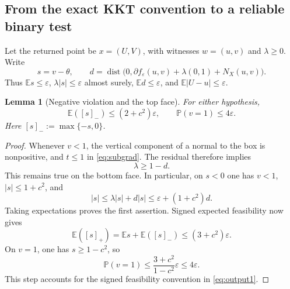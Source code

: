 \documentclass[11pt,a4paper]{article}
\newcommand{\E}{\mathbb E}
\newcommand{\Pp}{\mathbb P}
\newcommand{\eps}{\varepsilon}
\DeclareMathOperator{\dist}{dist}
\newtheorem{lemma}[theorem]{Lemma}
\theoremstyle{remark}
\numberwithin{equation}{section}
\begin{document}
\subsection{From the exact KKT convention to a reliable binary test}
Let the returned point be $x=(U,V)$, with witnesses $w=(u,v)$ and $\lambda\ge0$. Write
\[
 s=v-\theta,\qquad
 d=\dist\bigl(0,\partial f_\eps(u,v)+\lambda(0,1)+N_X(u,v)\bigr).
\]
Thus $\E s\le\eps$, $\lambda|s|\le\eps$ almost surely, $\E d\le\eps$, and $\E|U-u|\le\eps$.

\begin{lemma}[Negative violation and the top face]\label{lem:negative}
For either hypothesis,
\[
 \E([s]_-)\le(2+c^2)\eps,
 \qquad
 \Pp(v=1)\le4\eps.
\]
Here $[s]_-:=\max\{-s,0\}$.
\end{lemma}
\begin{proof}
Whenever $v<1$, the vertical component of a normal to the box is nonpositive, and $t\le1$ in \eqref{eq:subgrad}. The residual therefore implies
\begin{equation}
 \lambda\ge1-d.\label{eq:lambdalower}
\end{equation}
This remains true on the bottom face. In particular, on $s<0$ one has $v<1$, $|s|\le1+c^2$, and
\[
 |s|\le\lambda|s|+d|s|\le\eps+(1+c^2)d.
\]
Taking expectations proves the first assertion. Signed expected feasibility now gives
\[
 \E([s]_+)=\E s+\E([s]_-)\le(3+c^2)\eps.
\]
On $v=1$, one has $s\ge1-c^2$, so
\[
 \Pp(v=1)\le\frac{3+c^2}{1-c^2}\eps\le4\eps.
\]
This step accounts for the signed feasibility convention in \eqref{eq:output1}.
\end{proof}
\end{document}
